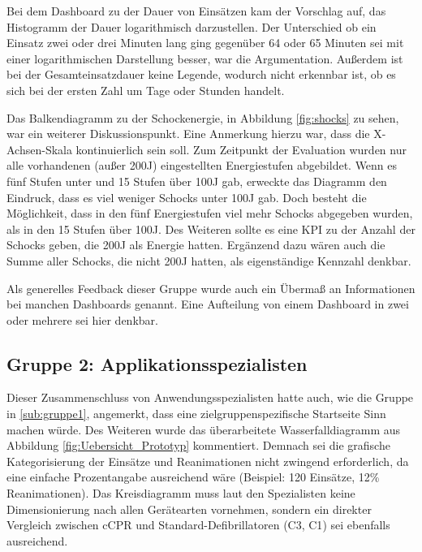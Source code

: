 Bei dem Dashboard zu der Dauer von Einsätzen kam der Vorschlag auf, das Histogramm der Dauer logarithmisch darzustellen.
Der Unterschied ob ein Einsatz zwei oder drei Minuten lang ging gegenüber 64 oder 65 Minuten sei mit einer logarithmischen Darstellung besser, war die Argumentation.
Außerdem ist bei der Gesamteinsatzdauer keine Legende, wodurch nicht erkennbar ist, ob es sich bei der ersten Zahl um  Tage oder Stunden handelt.

Das Balkendiagramm zu der Schockenergie, in Abbildung \ref{fig:shocks} zu sehen, war ein weiterer Diskussionspunkt.
Eine Anmerkung hierzu war, dass die X-Achsen-Skala kontinuierlich sein soll. 
Zum Zeitpunkt der Evaluation wurden nur alle vorhandenen (außer 200J) eingestellten Energiestufen abgebildet.
Wenn es fünf Stufen unter und 15 Stufen über 100J gab, erweckte das Diagramm den Eindruck, dass es viel weniger Schocks unter 100J gab.
Doch besteht die Möglichkeit, dass in den fünf Energiestufen viel mehr Schocks abgegeben wurden, als in den 15 Stufen über 100J.
Des Weiteren sollte es eine \gls{KPI} zu der Anzahl der Schocks geben, die 200J als Energie hatten.
Ergänzend dazu wären auch die Summe aller Schocks, die nicht 200J hatten, als eigenständige Kennzahl denkbar.

Als generelles Feedback dieser Gruppe wurde auch ein Übermaß an Informationen bei manchen Dashboards genannt.
Eine Aufteilung von einem Dashboard in zwei oder mehrere sei hier denkbar.

\subsection{Gruppe 2: Applikationsspezialisten}
\label{sub:gruppe2}
Dieser Zusammenschluss von Anwendungsspezialisten hatte auch, wie die Gruppe in \ref{sub:gruppe1}, angemerkt, dass eine zielgruppenspezifische Startseite Sinn machen würde.
Des Weiteren wurde das überarbeitete Wasserfalldiagramm aus Abbildung \ref{fig:Uebersicht_Prototyp} kommentiert. 
Demnach sei die grafische Kategorisierung der Einsätze und Reanimationen nicht zwingend erforderlich, da eine einfache Prozentangabe ausreichend wäre (Beispiel: 120 Einsätze, 12\% Reanimationen).
Das Kreisdiagramm muss laut den Spezialisten keine Dimensionierung nach allen Gerätearten vornehmen, sondern ein direkter Vergleich zwischen \gls{cCPR} und Standard-Defibrillatoren  (\gls{C3}, \gls{C1}) sei ebenfalls ausreichend.

